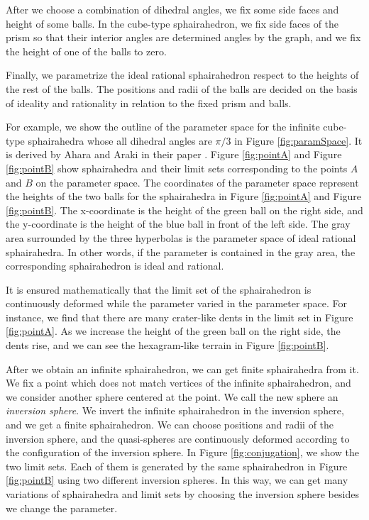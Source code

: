 After we choose a combination of dihedral angles, we fix some side
faces and height of some balls.
In the cube-type sphairahedron, we fix side faces
of the prism so that their interior angles are determined
angles by the graph, and we fix the height of one of the balls to zero.

Finally, we parametrize the ideal rational sphairahedron respect to the
heights of the rest of the balls.
The positions and radii of the balls are decided on the basis of
ideality and rationality in relation to the fixed prism and
balls.

For example, we show the outline of the parameter space for the infinite
cube-type sphairahedra whose all dihedral angles are $\pi / 3$ in Figure
\ref{fig:paramSpace}.
It is derived by Ahara and Araki in their paper
\cite{ahara2003sphairahedral}.
Figure \ref{fig:pointA} and Figure \ref{fig:pointB} show sphairahedra
and their limit sets corresponding to the points $A$ and $B$ on the
parameter space.
The coordinates of the parameter space represent the heights of the two
balls for the sphairahedra in Figure
\ref{fig:pointA} and Figure
\ref{fig:pointB}.
The x-coordinate is the height of the green ball on the right side, and
the y-coordinate is the height of the blue ball in front of
the left side.
The gray area surrounded by the three hyperbolas is the
parameter space of ideal rational sphairahedra.
In other words, if the parameter is contained in the gray area,
the corresponding sphairahedron is ideal and rational.

It is ensured mathematically that the limit set of the
sphairahedron is continuously deformed while the parameter varied
in the parameter space.
For instance, we find that there are many crater-like dents in the limit
set in Figure \ref{fig:pointA}.
As we increase the height of the green ball on the right side, the dents
rise, and we can see the hexagram-like terrain in Figure
\ref{fig:pointB}.

After we obtain an infinite sphairahedron, we can get
finite sphairahedra from it.
We fix a point which does not match vertices of the infinite
sphairahedron, and we consider another sphere centered at the point.
We call the new sphere an \textit{inversion sphere}.
We invert the infinite sphairahedron in the inversion sphere, and we get
a finite sphairahedron.
We can choose positions and radii of the inversion sphere, and
the quasi-spheres are continuously deformed according to the
configuration of the inversion sphere.
In Figure \ref{fig:conjugation}, we show the two limit sets.
Each of them is generated by the same sphairahedron in Figure
\ref{fig:pointB} using two different inversion spheres.
In this way, we can get many variations of sphairahedra and limit sets
by choosing the inversion sphere besides we change the parameter.


